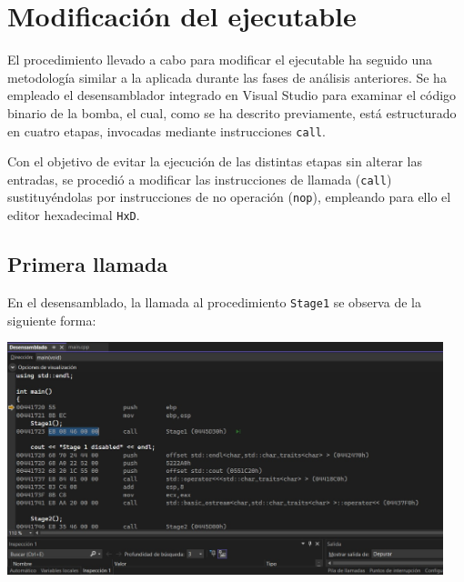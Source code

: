 \documentclass[11pt,a4paper]{article}
\begin{document}
\section{Modificación del ejecutable}

El procedimiento llevado a cabo para modificar el ejecutable ha seguido una metodología similar a la aplicada durante las fases de análisis anteriores. Se ha empleado el desensamblador integrado en Visual Studio para examinar el código binario de la bomba, el cual, como se ha descrito previamente, está estructurado en cuatro etapas, invocadas mediante instrucciones \texttt{call}.\vspace{2ex}

\noindent Con el objetivo de evitar la ejecución de las distintas etapas sin alterar las entradas, se procedió a modificar las instrucciones de llamada (\texttt{call}) sustituyéndolas por instrucciones de no operación (\texttt{nop}), empleando para ello el editor hexadecimal \texttt{HxD}.\vspace{2ex}

\subsection{Primera llamada}
\noindent En el desensamblado, la llamada al procedimiento \texttt{Stage1} se observa de la siguiente forma:
\begin{center}
\includegraphics[width=0.95\textwidth]{4-1.png}
\end{center}
\vspace{2ex}
\end{document}
